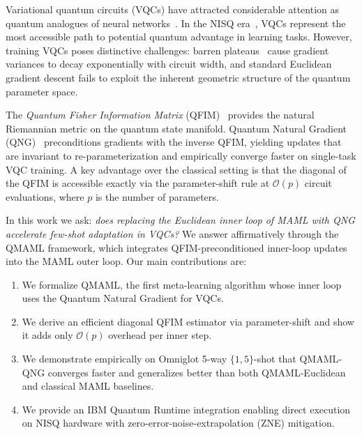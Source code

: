 \documentclass[a4paper,nopdfoutputerror]{quantumarticle}
\begin{document}
Variational quantum circuits (VQCs) have attracted considerable attention as
quantum analogues of neural networks~\cite{cerezo2021variational,biamonte2017}.
In the NISQ era~\cite{preskill2018quantum}, VQCs represent the most
accessible path to potential quantum advantage in learning tasks.
However, training VQCs poses distinctive challenges: barren
plateaus~\cite{mcclean2018barren} cause gradient variances to decay
exponentially with circuit width, and standard Euclidean gradient descent
fails to exploit the inherent geometric structure of the quantum parameter
space.

The \emph{Quantum Fisher Information Matrix}
(QFIM)~\cite{stokes2020quantum,meyer2021fisher} provides the natural
Riemannian metric on the quantum state manifold.
Quantum Natural Gradient (QNG)~\cite{stokes2020quantum} preconditions
gradients with the inverse QFIM, yielding updates that are invariant to
re-parameterization and empirically converge faster on single-task VQC
training.
A key advantage over the classical setting is that the diagonal of the QFIM
is accessible exactly via the parameter-shift rule at $\mathcal{O}(p)$ circuit
evaluations, where $p$ is the number of parameters.

In this work we ask: \emph{does replacing the Euclidean inner loop of MAML
with QNG accelerate few-shot adaptation in VQCs?}
We answer affirmatively through the QMAML framework, which integrates
QFIM-preconditioned inner-loop updates into the MAML outer loop.
Our main contributions are:

\begin{enumerate}
  \item We formalize QMAML, the first meta-learning algorithm whose inner
        loop uses the Quantum Natural Gradient for VQCs.
  \item We derive an efficient diagonal QFIM estimator via parameter-shift
        and show it adds only $\mathcal{O}(p)$ overhead per inner step.
  \item We demonstrate empirically on Omniglot 5-way $\{1,5\}$-shot that
        QMAML-QNG converges faster and generalizes better than both
        QMAML-Euclidean and classical MAML baselines.
  \item We provide an IBM Quantum Runtime integration enabling direct
        execution on NISQ hardware with zero-error-noise-extrapolation (ZNE)
        mitigation.
\end{enumerate}

\end{document}
